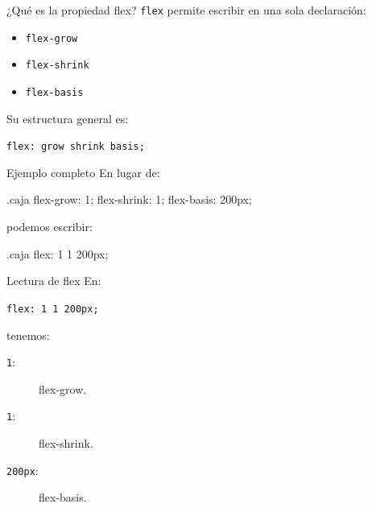 \documentclass[aspectratio=169,11.5pt]{beamer}
\begin{document}
    \begin{frame}{¿Qué es la propiedad flex?}
        \texttt{flex} permite escribir en una sola declaración:

        \begin{itemize}
            \item \texttt{flex-grow}
            \item \texttt{flex-shrink}
            \item \texttt{flex-basis}
        \end{itemize}

        Su estructura general es:

        \begin{center}
            \Large
            \texttt{flex: grow shrink basis;}
        \end{center}
    \end{frame}

    \begin{frame}[fragile]{Ejemplo completo}
        En lugar de:

        \begin{csscodedark}
            .caja {
                flex-grow: 1;
                flex-shrink: 1;
                flex-basis: 200px;
            }
        \end{csscodedark}

        podemos escribir:

        \begin{csscodedark}
            .caja {
                flex: 1 1 200px;
            }
        \end{csscodedark}
    \end{frame}

    \begin{frame}{Lectura de flex}
        En:

        \begin{center}
            \Large
            \texttt{flex: 1 1 200px;}
        \end{center}

        tenemos:

        \begin{description}
            \item[\texttt{1}:]
            flex-grow.

            \item[\texttt{1}:]
            flex-shrink.

            \item[\texttt{200px}:]
            flex-basis.
        \end{description}
    \end{frame}
\end{document}

